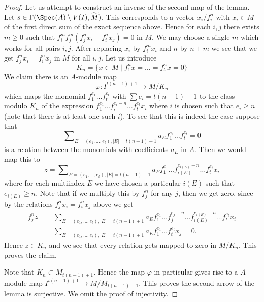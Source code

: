 \begin{proof}
\medskip\noindent
Let us attempt to construct an inverse of the second map of the lemma.
Let $s \in \Gamma(\Spec(A) \setminus V(I), \widetilde{M})$.
This corresponds to a vector $x_i/f_i^n$ with $x_i \in M$ of the
first direct sum of the exact sequence above.
Hence for each $i, j$ there exists $m \geq 0$
such that $f_i^m f_j^m (f_j^n x_i - f_i^n x_j) = 0$ in $M$.
We may choose a single $m$ which works for all pairs $i, j$.
After replacing $x_i$ by $f_i^mx_i$ and $n$ by $n + m$ we see
that we get $f_j^nx_i = f_i^nx_j$ in $M$ for all $i, j$.
Let us introduce
$$
K_n = \{x \in M \mid f_1^nx = \ldots = f_t^nx = 0\}
$$
We claim there is an $A$-module map
$$
\varphi :
I^{t(n - 1) + 1}
\longrightarrow
M/K_n
$$
which maps the monomial
$f_1^{e_1} \ldots f_t^{e_t}$ with $\sum e_i = t(n - 1) + 1$
to the class modulo $K_n$ of the expression
$f_1^{e_1} \ldots f_i^{e_i - n} \ldots f_t^{e_t}x_i$
where $i$ is chosen such that $e_i \geq n$ (note that there
is at least one such $i$).
To see that this is indeed the case suppose that
$$
\sum\nolimits_{E = (e_1, \ldots, e_t), |E| = t(n - 1) + 1}
a_E f_1^{e_1} \ldots f_t^{e_t} = 0
$$
is a relation between the monomials with coefficients $a_E$ in $A$.
Then we would map this to
$$
z =
\sum\nolimits_{E = (e_1, \ldots, e_t), |E| = t(n - 1) + 1}
a_E f_1^{e_1} \ldots f_{i(E)}^{e_{i(E)} - n} \ldots f_t^{e_t}x_i
$$
where for each multiindex $E$ we have chosen a particular $i(E)$
such that $e_{i(E)} \geq n$.
Note that if we multiply this by $f_j^n$ for any $j$, then
we get zero, since by the relations $f_j^nx_i = f_i^nx_j$ above we get
\begin{align*}
f_j^nz & = \sum\nolimits_{E = (e_1, \ldots, e_t), |E| = t(n - 1) + 1}
a_E f_1^{e_1} \ldots f_j^{e_j + n}
\ldots f_{i(E)}^{e_{i(E)} - n} \ldots f_t^{e_t}x_i \\
& =
\sum\nolimits_{E = (e_1, \ldots, e_t), |E| = t(n - 1) + 1}
a_E f_1^{e_1} \ldots f_t^{e_t}x_j
= 0.
\end{align*}
Hence $z \in K_n$ and we see that every relation gets mapped to zero
in $M/K_n$. This proves the claim.

\medskip\noindent
Note that $K_n \subset M_{t(n - 1) + 1}$. Hence the
map $\varphi$ in particular gives rise to a $A$-module map
$I^{t(n - 1) + 1} \to M/M_{t(n - 1) + 1}$.
This proves the second arrow of the lemma is surjective.
We omit the proof of injectivity.
\end{proof}

